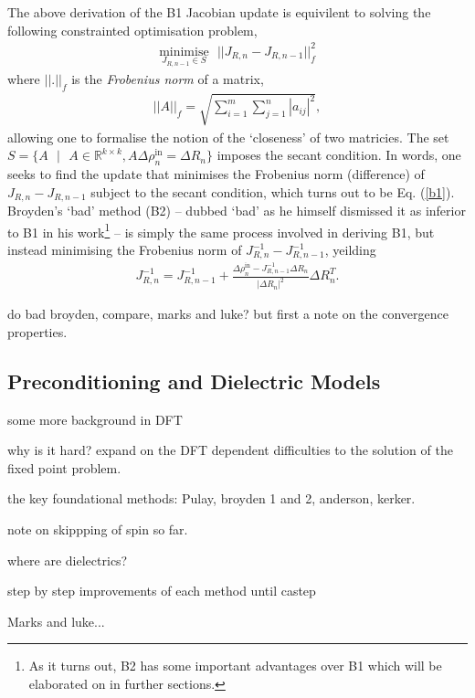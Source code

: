 The above derivation of the B1 Jacobian update is equivilent to solving the following constrainted optimisation problem,
\begin{gather}
\underset{J_{R,n-1} \in S}{\text{minimise}} \text{ } ||J_{R,n} - J_{R,n-1}||_f^2
\end{gather}
where $||.||_f$ is the \textit{Frobenius norm} of a matrix,
\begin{gather}
||A||_f = \sqrt{\sum_{i=1}^m \sum_{j=1}^n |a_{ij}|^2},
\end{gather}
allowing one to formalise the notion of the `closeness' of two matricies. The set $S = \{ A \text{ } | \text{ }  A \in \mathbb{R}^{k \times k}, A \Delta \rho^{\text{in}}_n = \Delta R_n \}$ imposes the secant condition. In words, one seeks to find the update that minimises the Frobenius norm (difference) of $J_{R,n} - J_{R,n-1}$ subject to the secant condition, which turns out to be Eq$.$ (\ref{b1}). Broyden's `bad' method (B2) -- dubbed `bad' as he himself dismissed it as inferior to B1 in his work\footnote{As it turns out, B2 has some important advantages over B1 which will be elaborated on in further sections.} -- is simply the same process involved in deriving B1, but instead minimising the Frobenius norm of $J^{-1}_{R,n} - J^{-1}_{R,n-1}$, yeilding
\begin{gather}
\label{b2}
J_{R,n}^{-1} =  J_{R,n-1}^{-1} + \frac{\Delta \rho^{\text{in}}_n - J_{R,n-1}^{-1} \Delta R_n }{ |\Delta R_n|^2} \Delta R_n^T.
\end{gather}



do bad broyden, compare, marks and luke?
but first a note on the convergence properties.

\subsection{Preconditioning and Dielectric Models}


some more background in DFT

why is it hard? expand on the DFT dependent difficulties to the solution of the fixed point problem. 

the key foundational methods: Pulay, broyden 1 and 2, anderson, kerker. 

note on skippping of spin so far. 

where are dielectrics? 

step by step improvements of each method until castep

Marks and luke...\\

